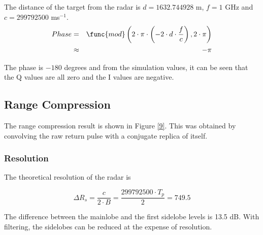 \smallskip The distance of the target from the radar is $d=1632.744928$ m,
\smallskip $f=1$ GHz and \smallskip $c=299792500$ ms$^{-1}$.\smallskip 
\begin{eqnarray}
Phase &=&\func{mod}\left( 2\cdot \pi \cdot \left( -2\cdot d\cdot \frac{f}{c}%
\right) ,2\cdot \pi \right)  \\
&\approx &-\pi 
\end{eqnarray}

\smallskip

The phase is $-180$ degrees and from the simulation values, it can be seen
that the Q values are all zero and the I values are negative.

\subsection{\protect\smallskip \protect\smallskip Range Compression}

\smallskip The range compression result is shown in Figure \ref{9}. This was
obtained by convolving the raw return pulse with a conjugate replica of
itself.

\subsubsection{Resolution}

The theoretical resolution of the radar is

\begin{equation}
\Delta R_{s}=\frac{c}{2\cdot B}=\frac{299792500\cdot T_{p}}{2}=749.5
\end{equation}


The difference between the mainlobe and the first sidelobe levels is 13.5
dB. With filtering, the sidelobes can be reduced at the expense of
resolution.
